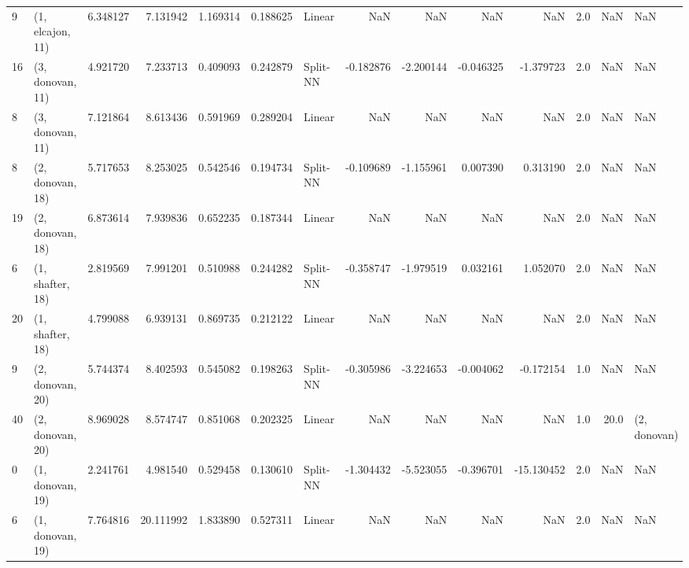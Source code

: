 \begin{tabular}{llrrrrlrrrrrrl}
9  &  (1, elcajon, 11) &   6.348127 &   7.131942 &   1.169314 &  0.188625 &      Linear &             NaN &           NaN &            NaN &          NaN &            2.0 &    NaN &              NaN \\
16 &  (3, donovan, 11) &   4.921720 &   7.233713 &   0.409093 &  0.242879 &    Split-NN &       -0.182876 &     -2.200144 &      -0.046325 &    -1.379723 &            2.0 &    NaN &              NaN \\
8  &  (3, donovan, 11) &   7.121864 &   8.613436 &   0.591969 &  0.289204 &      Linear &             NaN &           NaN &            NaN &          NaN &            2.0 &    NaN &              NaN \\
8  &  (2, donovan, 18) &   5.717653 &   8.253025 &   0.542546 &  0.194734 &    Split-NN &       -0.109689 &     -1.155961 &       0.007390 &     0.313190 &            2.0 &    NaN &              NaN \\
19 &  (2, donovan, 18) &   6.873614 &   7.939836 &   0.652235 &  0.187344 &      Linear &             NaN &           NaN &            NaN &          NaN &            2.0 &    NaN &              NaN \\
6  &  (1, shafter, 18) &   2.819569 &   7.991201 &   0.510988 &  0.244282 &    Split-NN &       -0.358747 &     -1.979519 &       0.032161 &     1.052070 &            2.0 &    NaN &              NaN \\
20 &  (1, shafter, 18) &   4.799088 &   6.939131 &   0.869735 &  0.212122 &      Linear &             NaN &           NaN &            NaN &          NaN &            2.0 &    NaN &              NaN \\
9  &  (2, donovan, 20) &   5.744374 &   8.402593 &   0.545082 &  0.198263 &    Split-NN &       -0.305986 &     -3.224653 &      -0.004062 &    -0.172154 &            1.0 &    NaN &              NaN \\
40 &  (2, donovan, 20) &   8.969028 &   8.574747 &   0.851068 &  0.202325 &      Linear &             NaN &           NaN &            NaN &          NaN &            1.0 &   20.0 &     (2, donovan) \\
0  &  (1, donovan, 19) &   2.241761 &   4.981540 &   0.529458 &  0.130610 &    Split-NN &       -1.304432 &     -5.523055 &      -0.396701 &   -15.130452 &            2.0 &    NaN &              NaN \\
6  &  (1, donovan, 19) &   7.764816 &  20.111992 &   1.833890 &  0.527311 &      Linear &             NaN &           NaN &            NaN &          NaN &            2.0 &    NaN &              NaN \\

\end{tabular}
